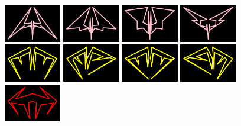 \begin{figure}[H]
    \includegraphics[width=2.5cm]{preface/vector_images/vec_image_ener11.png}
    \includegraphics[width=2.5cm]{preface/vector_images/vec_image_ener12.png}
    \includegraphics[width=2.5cm]{preface/vector_images/vec_image_ener13.png}
    \includegraphics[width=2.5cm]{preface/vector_images/vec_image_ener14.png}
    \includegraphics[width=2.5cm]{preface/vector_images/vec_image_ener21.png}
    \includegraphics[width=2.5cm]{preface/vector_images/vec_image_ener22.png}
    \includegraphics[width=2.5cm]{preface/vector_images/vec_image_ener23.png}
    \includegraphics[width=2.5cm]{preface/vector_images/vec_image_ener24.png}
    \includegraphics[width=2.5cm]{preface/vector_images/vec_image_ener41.png}

\end{figure}
